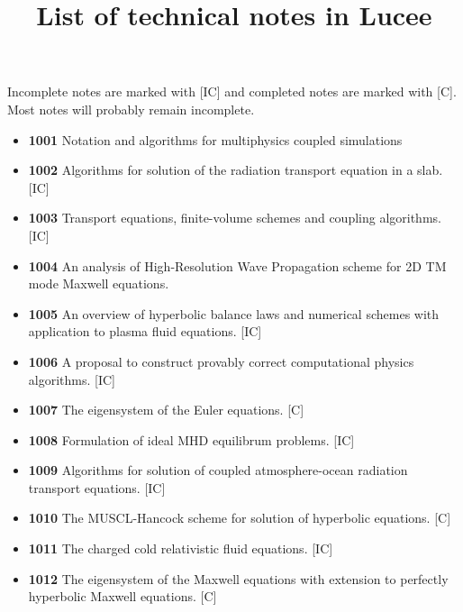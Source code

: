 \documentclass[11pt]{article}
\title{List of technical notes in Lucee}
\author{}
\date{}
\begin{document}
\maketitle

Incomplete notes are marked with [IC] and completed notes are marked
with [C]. Most notes will probably remain incomplete.

\begin{itemize}
\item {\bf 1001} Notation and algorithms for multiphysics coupled
  simulations
\item {\bf 1002} Algorithms for solution of the radiation transport
  equation in a slab. [IC]
\item {\bf 1003} Transport equations, finite-volume schemes and
  coupling algorithms. [IC]
\item {\bf 1004} An analysis of High-Resolution Wave Propagation
  scheme for 2D TM mode Maxwell equations.
\item {\bf 1005} An overview of hyperbolic balance laws and
  numerical schemes with application to plasma fluid equations. [IC]
\item {\bf 1006} A proposal to construct provably correct
  computational physics algorithms. [IC]
\item {\bf 1007} The eigensystem of the Euler equations. [C]
\item {\bf 1008} Formulation of ideal MHD equilibrum problems. [IC]
\item {\bf 1009} Algorithms for solution of coupled atmosphere-ocean
  radiation transport equations. [IC]
\item {\bf 1010} The MUSCL-Hancock scheme for solution of hyperbolic
  equations. [C]
\item {\bf 1011} The charged cold relativistic fluid equations. [IC]
\item {\bf 1012} The eigensystem of the Maxwell equations with
  extension to perfectly hyperbolic Maxwell equations. [C]
\end{itemize}
\end{document}
